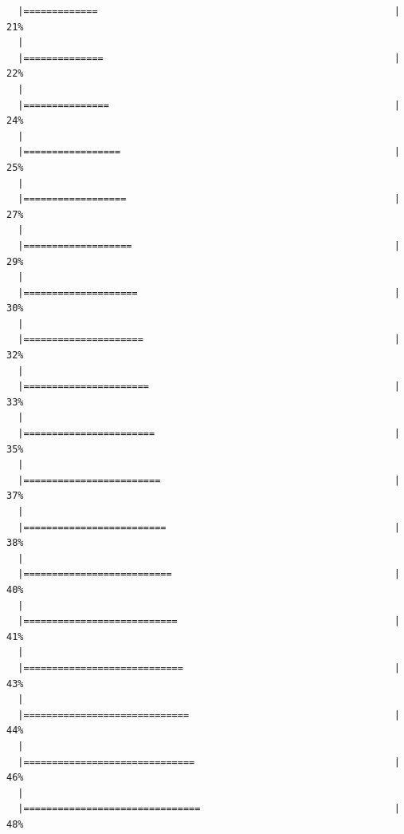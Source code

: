 \documentclass[]{book}
\begin{document}
\begin{verbatim}
  |=============                                                    |  21%
  |                                                                       
  |==============                                                   |  22%
  |                                                                       
  |===============                                                  |  24%
  |                                                                       
  |=================                                                |  25%
  |                                                                       
  |==================                                               |  27%
  |                                                                       
  |===================                                              |  29%
  |                                                                       
  |====================                                             |  30%
  |                                                                       
  |=====================                                            |  32%
  |                                                                       
  |======================                                           |  33%
  |                                                                       
  |=======================                                          |  35%
  |                                                                       
  |========================                                         |  37%
  |                                                                       
  |=========================                                        |  38%
  |                                                                       
  |==========================                                       |  40%
  |                                                                       
  |===========================                                      |  41%
  |                                                                       
  |============================                                     |  43%
  |                                                                       
  |=============================                                    |  44%
  |                                                                       
  |==============================                                   |  46%
  |                                                                       
  |===============================                                  |  48%

\end{verbatim}
\end{document}
